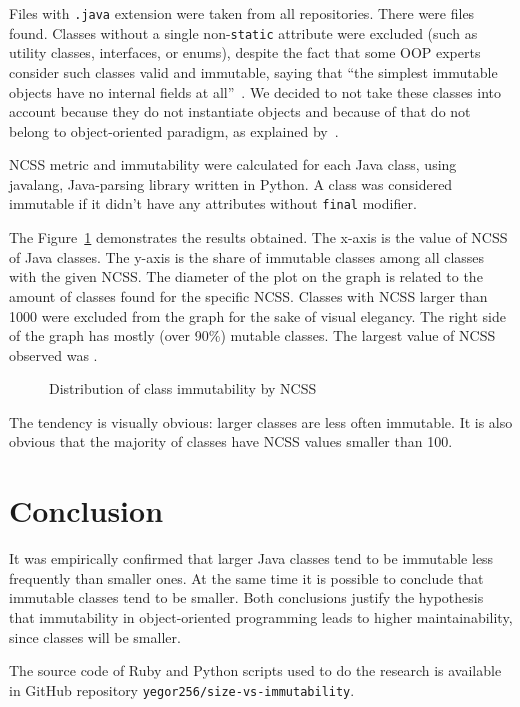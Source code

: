 \documentclass[12pt]{article}
\begin{document}
Files with \texttt{.java} extension were taken from all repositories.
There were \thetotaljavafiles{} files found. Classes without a single
non-\texttt{static} attribute were excluded (such as utility classes,
interfaces, or enums), despite the fact that some OOP
experts consider such classes valid and immutable, saying that
``the simplest immutable objects have no internal fields at all''~\citep{lea2000}.
We decided to not take these classes into account because they do not instantiate objects
and because of that do not belong to object-oriented paradigm,
as explained by~\cite{west2004,bugayenko2017}.

NCSS metric and immutability were calculated for each Java class,
using javalang, Java-parsing library written in Python.
A class was considered immutable if it didn't have any
attributes without \texttt{final} modifier.

The Figure~\ref{fig:1} demonstrates the results obtained. The x-axis is
the value of NCSS of Java classes. The y-axis is the share of immutable classes among
all classes with the given NCSS. The diameter of the plot on the graph
is related to the amount of classes found for the specific NCSS. Classes
with NCSS larger than 1000 were excluded from the graph for the sake of
visual elegancy.
The right side of the graph has mostly (over 90\%) mutable classes. The largest
value of NCSS observed was \thelargestncss{}.

\begin{figure}[h]
  
  \caption{Distribution of class immutability by NCSS}
  \label{fig:1}
\end{figure}

The tendency is visually obvious: larger classes are less often immutable. It
is also obvious that the majority of classes have NCSS values smaller than 100.

\section{Conclusion}

It was empirically confirmed that larger Java classes tend to be immutable
less frequently than smaller ones. At the same time it is possible to conclude
that immutable classes tend to be smaller. Both conclusions justify
the hypothesis that immutability in object-oriented programming leads
to higher maintainability, since classes will be smaller.

The source code of Ruby and Python scripts used to do the research
is available in GitHub repository \texttt{yegor256/size-vs-immutability}.


\end{document}
